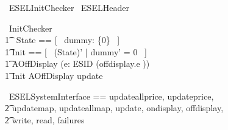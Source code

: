 \begin{zsection}
	\SECTION\ ESELInitChecker \parents\ ESELHeader
\end{zsection}


\begin{circus}
	\circprocess\ InitChecker \circdef \circbegin \\
        \t1 \circstate\ State == [~ dummy: \{0\} ~] \\
    	\t1	Init == [~ (State)' | dummy' = 0 ~] \\
        \t1 AOffDisplay \circdef (\Interleave e: ESID \circspot (offdisplay.e \then \Skip)) \\
	    \t1 \circspot \lschexpract Init \rschexpract \circseq AOffDisplay \circseq update \then \Skip \\
	\circend
\end{circus}

\begin{circus}
   \circchannelset\ ESELSystemInterface == \lchanset updateallprice, updateprice, \\
    \t2 updatemap, updateallmap, update, ondisplay, offdisplay, \\
    \t2 write, read, failures \rchanset \\
\end{circus}
